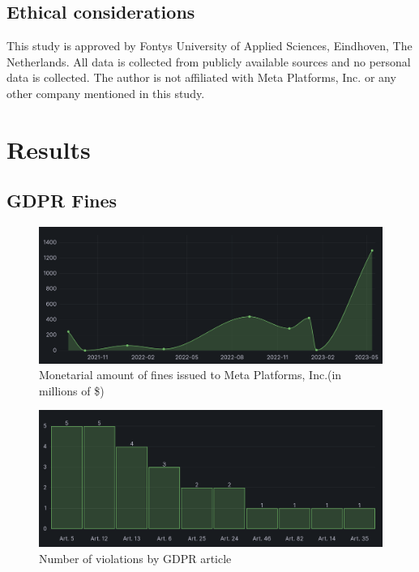 \documentclass[12pt, a4paper]{article}
\begin{document}
\subsection*{Ethical considerations}

This study is approved by Fontys University of Applied Sciences, Eindhoven, The
Netherlands. All data is collected from publicly available sources and no
personal data is collected. The author is not affiliated with Meta Platforms,
Inc. or any other company mentioned in this study.

\section*{Results}

\subsection*{GDPR Fines}

\begin{figure}[h]
    \centering
    \includegraphics[width=1.00\textwidth]{monetarial-amount-of-gdpr-fines}
    \caption{Monetarial amount of fines issued to Meta Platforms, Inc.(in
    millions of
    \$)\cite{gdprFine1,gdprFine2,gdprFine3,gdprFine4,gdprFine5,gdprFine6,gdprFine7,gdprFine8,gdprFine9}}
    \label{fig:amount-of-gdpr-fines}
\end{figure}

\begin{figure}[h]
    \centering
    \includegraphics[width=1.00\textwidth]{violations-by-article}
    \caption{Number of violations by GDPR
    article\cite{gdprFine1,gdprFine2,gdprFine3,gdprFine4,gdprFine5,gdprFine6,gdprFine7,gdprFine8,gdprFine9}}
    \label{fig:violations-by-article}
\end{figure}
\end{document}
